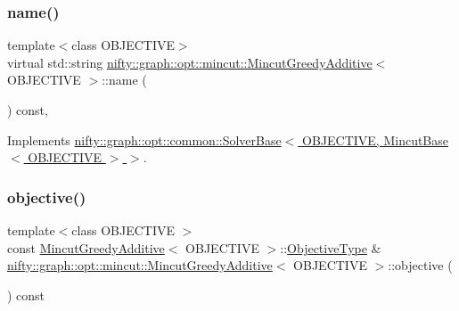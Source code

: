 \subsubsection{\texorpdfstring{name()}{name()}}
{\footnotesize\ttfamily template$<$class O\+B\+J\+E\+C\+T\+I\+VE$>$ \\
virtual std\+::string \hyperlink{classnifty_1_1graph_1_1opt_1_1mincut_1_1MincutGreedyAdditive}{nifty\+::graph\+::opt\+::mincut\+::\+Mincut\+Greedy\+Additive}$<$ O\+B\+J\+E\+C\+T\+I\+VE $>$\+::name (\begin{DoxyParamCaption}{ }\end{DoxyParamCaption}) const\hspace{0.3cm}{\ttfamily [inline]}, {\ttfamily [virtual]}}



Implements \hyperlink{classnifty_1_1graph_1_1opt_1_1common_1_1SolverBase_af638b9a804cfec3e35fe87c77e942d30}{nifty\+::graph\+::opt\+::common\+::\+Solver\+Base$<$ O\+B\+J\+E\+C\+T\+I\+V\+E, Mincut\+Base$<$ O\+B\+J\+E\+C\+T\+I\+V\+E $>$ $>$}.

\mbox{\label{classnifty_1_1graph_1_1opt_1_1mincut_1_1MincutGreedyAdditive_adddbe72afb04c110796dbcc753dd603a}} 
\subsubsection{\texorpdfstring{objective()}{objective()}}
{\footnotesize\ttfamily template$<$class O\+B\+J\+E\+C\+T\+I\+VE $>$ \\
const \hyperlink{classnifty_1_1graph_1_1opt_1_1mincut_1_1MincutGreedyAdditive}{Mincut\+Greedy\+Additive}$<$ O\+B\+J\+E\+C\+T\+I\+VE $>$\+::\hyperlink{classnifty_1_1graph_1_1opt_1_1mincut_1_1MincutGreedyAdditive_a1e4f0fc6675ac7d977619126bfd6e143}{Objective\+Type} \& \hyperlink{classnifty_1_1graph_1_1opt_1_1mincut_1_1MincutGreedyAdditive}{nifty\+::graph\+::opt\+::mincut\+::\+Mincut\+Greedy\+Additive}$<$ O\+B\+J\+E\+C\+T\+I\+VE $>$\+::objective (\begin{DoxyParamCaption}{ }\end{DoxyParamCaption}) const\hspace{0.3cm}{\ttfamily [virtual]}}



